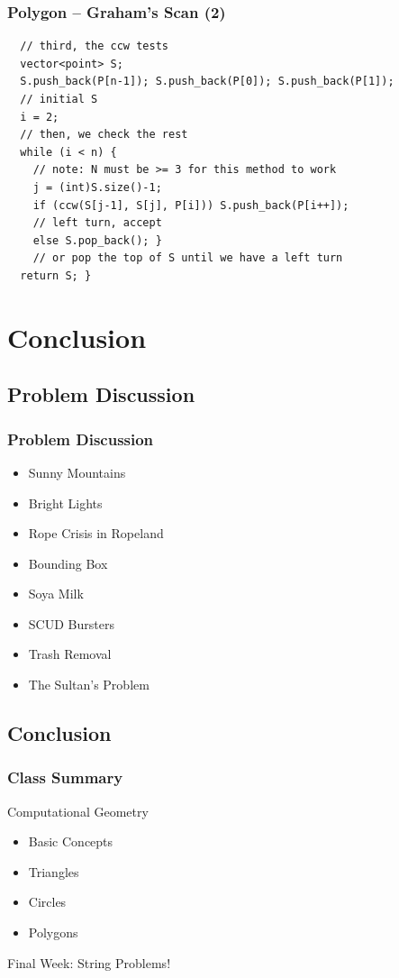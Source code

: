\documentclass{beamer}
\begin{document}
\begin{frame}
  \frametitle{Polygon -- Graham's Scan (2)}
  {\tiny
    \begin{exampleblock}{}

\begin{verbatim}
  // third, the ccw tests
  vector<point> S;
  S.push_back(P[n-1]); S.push_back(P[0]); S.push_back(P[1]);
  // initial S
  i = 2;
  // then, we check the rest
  while (i < n) {
    // note: N must be >= 3 for this method to work
    j = (int)S.size()-1;
    if (ccw(S[j-1], S[j], P[i])) S.push_back(P[i++]); 
    // left turn, accept
    else S.pop_back(); }
    // or pop the top of S until we have a left turn
  return S; }
\end{verbatim}
\end{exampleblock}}
\end{frame}


\section{Conclusion}

\subsection{Problem Discussion}
\begin{frame}
  \frametitle{Problem Discussion}
  \begin{itemize}
  \item Sunny Mountains
  \item Bright Lights
  \item Rope Crisis in Ropeland
  \item Bounding Box
  \item Soya Milk
  \item SCUD Bursters
  \item Trash Removal
  \item The Sultan's Problem
  \end{itemize}
\end{frame}

\subsection{Conclusion}
\begin{frame}
  \frametitle{Class Summary}
  Computational Geometry
  \begin{itemize}
  \item Basic Concepts
  \item Triangles
  \item Circles
  \item Polygons
  \end{itemize}

  \begin{block}{}
    Final Week: String Problems!
  \end{block}
\end{frame}
\end{document}

